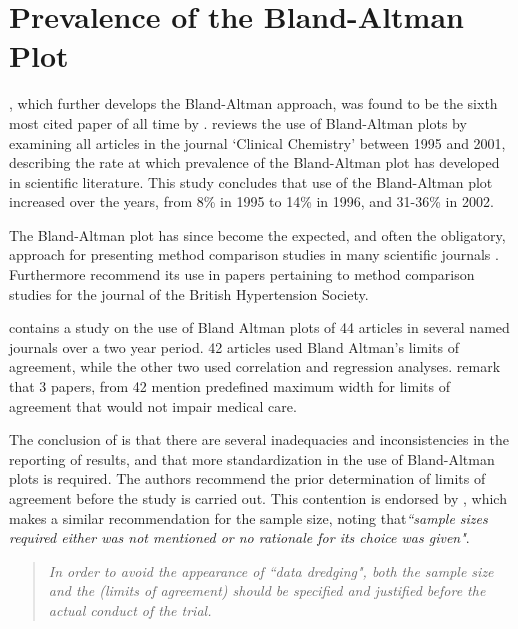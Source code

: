 \documentclass[12pt, a4paper]{report}
\theoremstyle{plain}
\theoremstyle{definition}
\theoremstyle{remark}
\begin{document}


\section{Prevalence of the Bland-Altman Plot}

\citet*{BA86}, which further develops the Bland-Altman approach,
was found to be the sixth most cited paper of all time by \citet{BAcite}. \cite{Dewitte} reviews the use of Bland-Altman plots by examining all articles in the journal `Clinical Chemistry' between 1995 and 2001, describing the rate at which
prevalence of the Bland-Altman plot has developed in scientific
literature. This study concludes that use of the Bland-Altman plot increased over the years, from 8\% in 1995 to
14\% in 1996, and 31-36\% in 2002.

The Bland-Altman plot has since become the expected, and often the obligatory, approach for presenting method comparison
studies in many scientific journals \citep{hollis}. Furthermore \citet{BritHypSoc} recommend its use in papers pertaining to
method comparison studies for the journal of the British Hypertension Society.

\citet{mantha} contains a study on the use of Bland Altman plots of 44 articles in several named journals over a two year period. 42 articles used Bland Altman's limits of agreement, while the other two used correlation and regression analyses. \citet{mantha} remark that 3 papers, from 42 mention predefined maximum width for limits of agreement that would not impair medical care.

The conclusion of \citet{mantha} is that there are several inadequacies and inconsistencies in the reporting of results, and
that more standardization in the use of Bland-Altman plots is required. The authors recommend the prior determination of limits of agreement before the study is carried out. This contention is endorsed by \citet{lin}, which makes a similar recommendation for the sample size, noting that\emph{``sample sizes required either was not mentioned or no rationale for its choice was given"}.

\begin{quote}
	\textit{In order to avoid the appearance of ``data dredging", both the
		sample size and the (limits of agreement) should be specified and
		justified before the actual conduct of the trial.} \citep{lin}
\end{quote}
\end{document}
